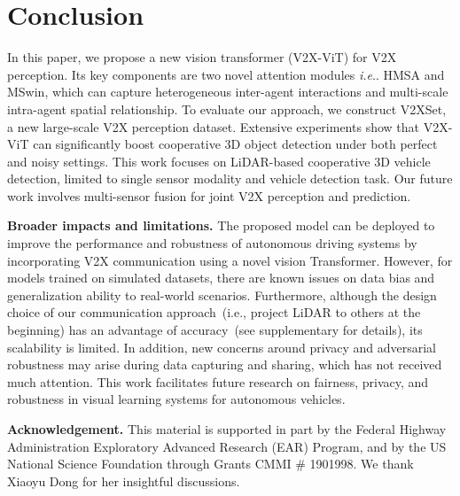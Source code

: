 \documentclass[runningheads]{llncs}
\makeatletter
\DeclareRobustCommand\onedot{\futurelet\@let@token\@onedot}
\def\@onedot{\ifx\@let@token.\else.\null\fi\xspace}
\def\ie{\emph{i.e}\onedot} \def\Ie{\emph{I.e}\onedot}
\makeatother
\begin{document}
\section{Conclusion}
In this paper, we propose a new vision transformer (V2X-ViT) for V2X perception. Its key components are two novel attention modules \ie HMSA and MSwin, which can capture heterogeneous inter-agent interactions and multi-scale intra-agent spatial relationship. 
%
To evaluate our approach, we construct V2XSet, a new large-scale V2X perception dataset.
%
Extensive experiments show that V2X-ViT can significantly boost cooperative 3D object detection under both perfect and noisy settings. 
%
This work focuses on LiDAR-based cooperative 3D vehicle detection, limited to single sensor modality and vehicle detection task.
%
Our future work involves multi-sensor fusion for joint V2X  perception and prediction.

\vspace{2mm}
\noindent\textbf{Broader impacts and limitations.} The proposed model can be deployed to improve the performance and robustness of autonomous driving systems by incorporating V2X communication using a novel vision Transformer. 
%
However, for models trained on simulated datasets, 
there are known issues on data bias and generalization ability to real-world scenarios. 
%
Furthermore, although the design choice of our communication approach~(i.e., project LiDAR to others at the beginning) has an advantage of accuracy~(see supplementary for details), its scalability is limited.
In addition, new concerns around privacy and adversarial robustness may arise during data capturing and sharing, which has not received much attention. 
%
This work facilitates future research on fairness, privacy, and robustness in visual learning systems for autonomous vehicles.  

\vspace{2mm}
\noindent\textbf{Acknowledgement.} This material is supported in part by the
Federal Highway Administration Exploratory Advanced Research (EAR) Program, and by the US National Science Foundation through Grants CMMI \# 1901998. We thank Xiaoyu Dong for her insightful discussions.



\clearpage
%
%
% 
% 
\end{document}
